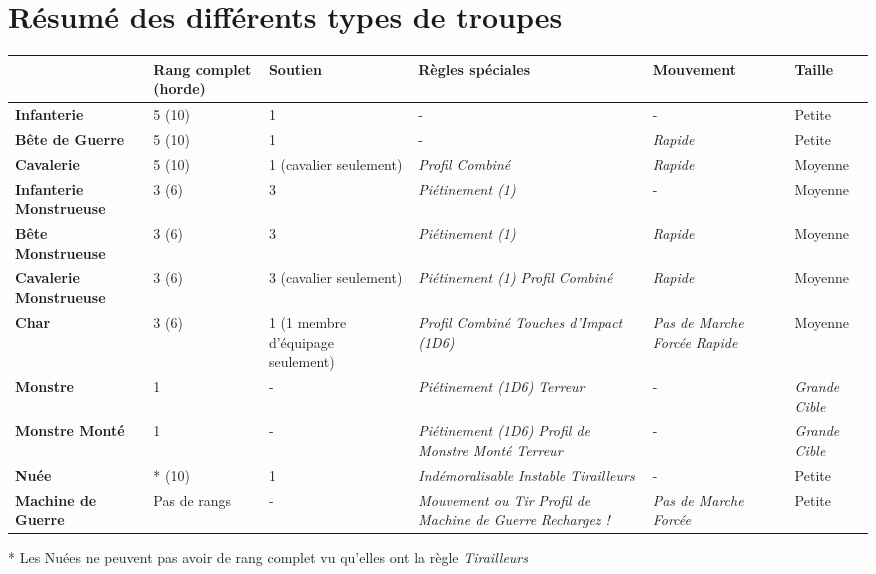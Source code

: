 \newpage
\section*{Résumé des différents types de troupes}

\renewcommand{\arraystretch}{1.48}
\begin{table}[!htbp]
\centering
\begin{tabular}{M{2.5cm}|M{2cm}M{2cm}M{3cm}M{2.3cm}M{2cm}}
 & \textbf{Rang complet (horde)} & \textbf{Soutien} & \textbf{Règles spéciales} & \textbf{Mouvement} & \textbf{Taille} \\
\hline
\textbf{Infanterie} & 5 (10) & 1 & - & - & Petite \\
\hline
\textbf{Bête de Guerre} & 5 (10) & 1 & - & \emph{Rapide} & Petite \\
\hline
\textbf{Cavalerie} & 5 (10) & 1 (cavalier seulement) & \emph{Profil Combiné} & \emph{Rapide} & Moyenne \\
\hline
\textbf{Infanterie Monstrueuse} & 3 (6) & 3 & \emph{Piétinement (1)} & - & Moyenne \\
\hline
\textbf{Bête Monstrueuse} & 3 (6) & 3 & \emph{Piétinement (1)} & \emph{Rapide} & Moyenne \\
\hline
\textbf{Cavalerie Monstrueuse} & 3 (6) & 3 (cavalier seulement) & \emph{Piétinement (1)} \newline \emph{Profil Combiné} & \emph{Rapide} & Moyenne \\
\hline
\textbf{Char} & 3 (6) & 1 \newline (1 membre d'équipage seulement) & \emph{Profil Combiné} \newline \emph{Touches d'Impact (1D6)} & \emph{Pas de Marche Forcée} \newline \emph{Rapide} & Moyenne \\
\hline
\textbf{Monstre} & 1 & - & \emph{Piétinement (1D6)} \newline \emph{Terreur} & - & \emph{Grande Cible} \\
\hline
\textbf{Monstre Monté} & 1 & - & \emph{Piétinement (1D6)} \newline \emph{Profil de Monstre Monté} \newline \emph{Terreur} & - & \emph{Grande Cible} \\
\hline
\textbf{Nuée} & * (10) & 1 & \emph{Indémoralisable} \newline \emph{Instable} \newline \emph{Tirailleurs} & - & Petite \\
\hline
\textbf{Machine de Guerre} & Pas de rangs & - & \emph{Mouvement ou Tir} \newline \emph{Profil de Machine de Guerre} \newline \emph{Rechargez !} & \emph{Pas de Marche Forcée} & Petite \\
\hline
\end{tabular}
* Les Nuées ne peuvent pas avoir de rang complet vu qu'elles ont la règle \emph{Tirailleurs}
\end{table}
\renewcommand{\arraystretch}{1.5}